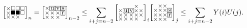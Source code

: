 \documentclass[a4paper,12pt]{article}
\makeatletter
\newcommand{\mybox}[1]{%
  \begingroup
  \setlength{\fboxsep}{1pt}%
  \fbox{\small #1}%
  \endgroup
}
\newenvironment{grid}
  {\begingroup\footnotesize
   \renewcommand{\arraystretch}{0}
   \setlength{\arraycolsep}{0pt}
   \left[\begin{array}{@{}*{10}{c}@{}}}
  {\end{array}\right]\endgroup}
\newcommand{\void}{\phantom{\times}}
\makeatother
\begin{document}
   	\[
		 \begin{grid}
			\times & \square & \square & \square \\
			\times & \blacksquare & \blacksquare & \square \\
			\times & \times & \times & \void
		    \end{grid}_n = \begin{grid}
			\times & \mybox{u} & \mybox{v} & \mybox{s} \\
			\times & \times & \times & \mybox{r} \\
			\times & \times & \times & \void
		 \end{grid}_{n-2} \le \sum_{i+j=n-2} \begin{grid}
			 \void & \void & \void & \times & \void\\
			 \times & \mybox{u} & \mybox{v} & \times & \times \\
			 \times & \times & \times & \times & \times \\
			 \times & \times & \times & \times & \void
		 \end{grid}_i \begin{grid}
			\void & \times & \times & \void \\
			\times & \times & \times & \mybox{s} \\
			\times & \times & \times & \mybox{r} \\
			\times & \times & \times & \void
		 \end{grid}_j \le \sum_{i+j=n-2} Y(i)U(j).
	\]
    
\end{document}
